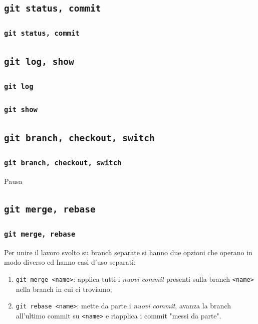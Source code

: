 \documentclass{beamer}
\begin{document}
\subsection{\texttt{git status, commit}}
\begin{frame}
  \frametitle{\texttt{git status, commit}}
\end{frame}

\subsection{\texttt{git log, show}}
\begin{frame}
  \frametitle{\texttt{git log}}
\end{frame}

\begin{frame}
  \frametitle{\texttt{git show}}
\end{frame}

\subsection{\texttt{git branch, checkout, switch}}
\begin{frame}
  \frametitle{\texttt{git branch, checkout, switch}}
\end{frame}

\begin{frame}[c]
  \centering
  Pausa
\end{frame}

\subsection{\texttt{git merge, rebase}}
\begin{frame}
  \frametitle{\texttt{git merge, rebase}}
  Per unire il lavoro svolto su branch separate si hanno due opzioni che operano
  in modo diverso ed hanno casi d'uso separati:
  \begin{enumerate}
    \item<1-> \texttt{git merge <name>}: applica tutti i \emph{nuovi commit}\footnotemark{}
      presenti sulla branch \texttt{<name>} nella branch in cui ci troviamo;
    \item<2-> \texttt{git rebase <name>}: mette da parte i
      \emph{nuovi commit}\footnotemark[\value{footnote}], avanza la branch
      all'ultimo commit su \texttt{<name>} e riapplica i commit "messi da parte".
  \end{enumerate}
\end{frame}
\end{document}
